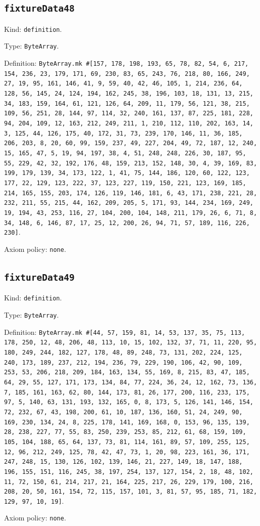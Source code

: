 \documentclass[11pt]{article}
\begin{document}
\subsection*{\texttt{fixtureData48}}
\noindent Kind: \texttt{definition}.\par
\noindent Type: \texttt{ByteArray}.\par
\noindent Definition: \texttt{ByteArray.mk \#[157, 178, 198, 193, 65, 78, 82, 54, 6, 217, 154, 236, 23, 179, 171, 69, 230, 83, 65, 243, 76, 218, 80, 166, 249, 27, 19, 95, 161, 146, 41, 9, 59, 40, 42, 46, 105, 1, 214, 236, 64, 128, 56, 145, 24, 124, 194, 162, 245, 38, 196, 103, 18, 131, 13, 215, 34, 183, 159, 164, 61, 121, 126, 64, 209, 11, 179, 56, 121, 38, 215, 109, 56, 251, 28, 144, 97, 114, 32, 240, 161, 137, 87, 225, 181, 228, 94, 204, 109, 12, 163, 212, 249, 211, 1, 210, 112, 110, 202, 163, 14, 3, 125, 44, 126, 175, 40, 172, 31, 73, 239, 170, 146, 11, 36, 185, 206, 203, 8, 20, 60, 99, 159, 237, 49, 227, 204, 49, 72, 187, 12, 240, 15, 165, 47, 5, 19, 94, 197, 38, 4, 51, 248, 248, 226, 30, 187, 95, 55, 229, 42, 32, 192, 176, 48, 159, 213, 152, 148, 30, 4, 39, 169, 83, 199, 179, 139, 34, 173, 122, 1, 41, 75, 144, 186, 120, 60, 122, 123, 177, 22, 129, 123, 222, 37, 123, 227, 119, 150, 221, 123, 169, 185, 214, 165, 155, 203, 174, 126, 119, 146, 181, 6, 43, 171, 238, 221, 28, 232, 211, 55, 215, 44, 162, 209, 205, 5, 171, 93, 144, 234, 169, 249, 19, 194, 43, 253, 116, 27, 104, 200, 104, 148, 211, 179, 26, 6, 71, 8, 34, 148, 6, 146, 87, 17, 25, 12, 200, 26, 94, 71, 57, 189, 116, 226, 230]}.\par
\noindent Axiom policy: \texttt{none}.\par
\subsection*{\texttt{fixtureData49}}
\noindent Kind: \texttt{definition}.\par
\noindent Type: \texttt{ByteArray}.\par
\noindent Definition: \texttt{ByteArray.mk \#[44, 57, 159, 81, 14, 53, 137, 35, 75, 113, 178, 250, 12, 48, 206, 48, 113, 10, 15, 102, 132, 37, 71, 11, 220, 95, 180, 249, 244, 182, 127, 178, 48, 89, 248, 73, 131, 202, 224, 125, 240, 173, 189, 237, 212, 194, 236, 79, 229, 190, 106, 42, 90, 109, 253, 53, 206, 218, 209, 184, 163, 134, 55, 169, 8, 215, 83, 47, 185, 64, 29, 55, 127, 171, 173, 134, 84, 77, 224, 36, 24, 12, 162, 73, 136, 7, 185, 161, 163, 62, 80, 144, 173, 81, 26, 177, 200, 116, 233, 175, 97, 5, 140, 63, 131, 193, 132, 165, 0, 8, 173, 5, 126, 141, 146, 154, 72, 232, 67, 43, 198, 200, 61, 10, 187, 136, 160, 51, 24, 249, 90, 169, 230, 134, 24, 8, 225, 178, 141, 169, 168, 0, 153, 96, 135, 139, 28, 238, 227, 77, 55, 83, 250, 239, 253, 85, 212, 61, 68, 159, 109, 105, 104, 188, 65, 64, 137, 73, 81, 114, 161, 89, 57, 109, 255, 125, 12, 96, 212, 249, 125, 78, 42, 47, 73, 1, 20, 98, 223, 161, 36, 171, 247, 248, 15, 130, 126, 102, 139, 146, 21, 227, 149, 18, 147, 188, 196, 155, 151, 116, 245, 38, 197, 254, 137, 127, 154, 2, 18, 48, 102, 11, 72, 150, 61, 214, 217, 21, 164, 225, 217, 26, 229, 179, 100, 216, 208, 20, 50, 161, 154, 72, 115, 157, 101, 3, 81, 57, 95, 185, 71, 182, 129, 97, 10, 19]}.\par
\noindent Axiom policy: \texttt{none}.\par
\end{document}
